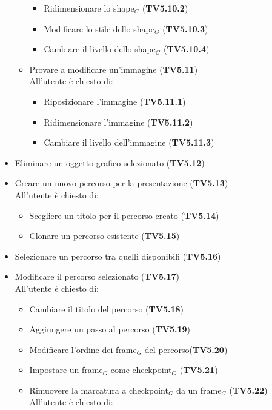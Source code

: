\begin{itemize}
\begin{itemize}
\begin{itemize}
		 	\item Ridimensionare lo shape$_G$ (\textbf{TV5.10.2})
		 	\item Modificare lo stile dello shape$_G$ (\textbf{TV5.10.3})
		 	\item Cambiare il livello dello shape$_G$ (\textbf{TV5.10.4})
		 \end{itemize}
		 \item Provare a modificare un'immagine (\textbf{TV5.11})\\
		 All'utente è chiesto di:
		 \begin{itemize}
		 	\item Riposizionare l'immagine (\textbf{TV5.11.1})
		 	\item Ridimensionare l'immagine (\textbf{TV5.11.2})
		 	\item Cambiare il livello dell'immagine (\textbf{TV5.11.3})
		 \end{itemize}
    \end{itemize}
    \item Eliminare un oggetto grafico selezionato (\textbf{TV5.12})
    \item Creare un nuovo percorso per la presentazione (\textbf{TV5.13})\\
    All'utente è chiesto di:
    \begin{itemize}
    	\item Scegliere un titolo per il percorso creato (\textbf{TV5.14})
    	\item Clonare un percorso esistente (\textbf{TV5.15})
    \end{itemize}
    \item Selezionare un percorso tra quelli disponibili (\textbf{TV5.16})
    \item Modificare il percorso selezionato (\textbf{TV5.17})\\
    All'utente è chiesto di:
    \begin{itemize}
    	\item Cambiare il titolo del percorso (\textbf{TV5.18})
    	\item Aggiungere un passo al percorso (\textbf{TV5.19})
    	\item Modificare l'ordine dei frame$_G$ del percorso(\textbf{TV5.20})
    	\item Impostare un frame$_G$ come checkpoint$_G$ (\textbf{TV5.21})
    	\item Rimuovere la marcatura a checkpoint$_G$ da un frame$_G$ (\textbf{TV5.22})\\
    	 All'utente è chiesto di:

\end{itemize}
\end{itemize}
